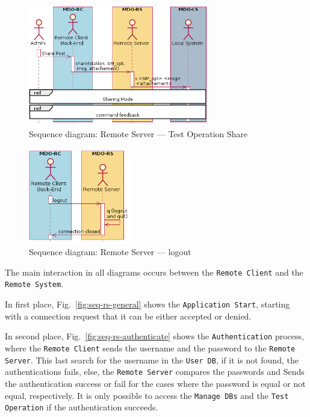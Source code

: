 \begin{figure}[htb!]
  \centering
  \includegraphics[width=0.7\textwidth]{img/seq-rs-test-op-sharing.png}%
  \caption{Sequence diagram: Remote Server --- Test Operation Share}%
  \label{fig:seq-rs-test-op-sharing}
\end{figure}

\begin{figure}[htb!]
  \centering
  \includegraphics[width=0.4\textwidth]{img/seq-rs-logout.png}%
  \caption{Sequence diagram: Remote Server --- logout}%
  \label{fig:seq-rs-logout}
\end{figure}

The main interaction in all diagrams occurs between the \texttt{Remote Client} and the \texttt{Remote System}.

In first place, Fig.~\ref{fig:seq-rs-general} shows the \texttt{Application Start}, starting with a connection request that it can be either accepted or denied.

In second place, Fig.~\ref{fig:seq-rs-authenticate} shows the \texttt{Authentication} process, where the \texttt{Remote Client} sends the username and the password to the \texttt{Remote Server}.
This last search for the username in the \texttt{User DB}, if it is not found, the authentications fails, else, the \texttt{Remote Server} compares the passwords and Sends the authentication success or fail for the cases where the password is equal or not equal, respectively.
It is only possible to access the \texttt{Manage DBs} and the \texttt{Test Operation} if the authentication succeeds.

